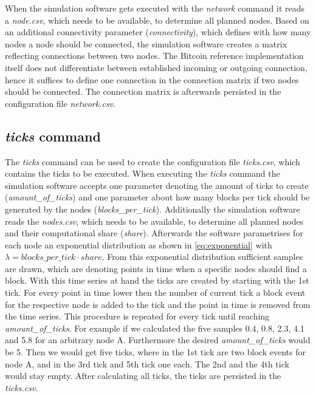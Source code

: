 When the simulation software gets executed with the \textit{network} command it reads a \textit{node.csv}, which needs to be available, to determine all planned nodes.
Based on an additional connectivity parameter (\textit{connectivity}), which defines with how many nodes a node should be connected, the simulation software creates a matrix reflecting connections between two nodes.
The Bitcoin reference implementation itself does not differentiate between established incoming or outgoing connection, hence it suffices to define one connection in the connection matrix if two nodes should be connected.
The connection matrix is afterwards persisted in the configuration file \textit{network.csv}.

\subsection{\textit{ticks} command} \label{chap:ticks_command}

The \textit{ticks} command can be used to create the configuration file \textit{ticks.csv}, which contains the ticks to be executed.
When executing the \textit{ticks} command the simulation software accepts one parameter denoting the amount of ticks to create (\textit{amount\_of\_ticks}) and one parameter about how many blocks per tick should be generated by the nodes (\textit{blocks\_per\_tick}).
Additionally the simulation software reads the \textit{nodes.csv}, which needs to be available, to determine all planned nodes and their computational share (\textit{share}).
Afterwards the software parametrises for each node an exponential distribution as shown in \ref{eq:exponential} with $\lambda = blocks\_per\_tick \cdot share$.
From this exponential distribution sufficient samples are drawn, which are denoting points in time when a specific nodes should find a block.
With this time series at hand the ticks are created by starting with the 1st tick.
For every point in time lower then the number of current tick a block event for the respective node is added to the tick and the point in time is removed from the time series.
This procedure is repeated for every tick until reaching \textit{amount\_of\_ticks}.
For example if we calculated the five samples 0.4, 0.8, 2.3, 4.1 and 5.8 for an arbitrary node A.
Furthermore the desired \textit{amount\_of\_ticks} would be 5.
Then we would get five ticks, where in the 1st tick are two block events for node A, and in the 3rd tick  and 5th tick one each.
The 2nd and the 4th tick would stay empty. After calculating all ticks, the ticks are persisted in the \textit{ticks.csv}.

